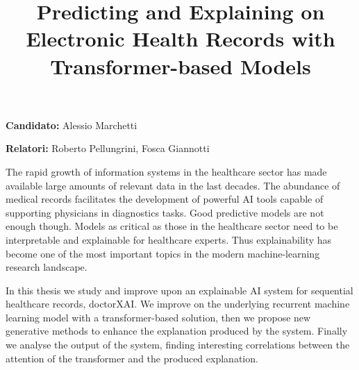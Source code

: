 \documentclass[]{marticle}
\title{\vspace{-2cm}\textbf{\huge Predicting and Explaining on Electronic Health Records with Transformer-based Models}}
\date{}
\author{}
\begin{document}
\maketitle


\textbf{Candidato:} Alessio Marchetti

\textbf{Relatori:} Roberto Pellungrini, Fosca Giannotti
\vspace{0.5cm}

The rapid growth of information systems in the healthcare sector has made available large amounts of
relevant data in the last decades. The abundance of medical records facilitates the development of
powerful AI tools capable of supporting physicians in diagnostics tasks. Good predictive models are
not enough though. Models as critical as those in the healthcare sector need to be interpretable and
explainable for healthcare experts. Thus explainability has become one of the most important topics
in the modern machine-learning research landscape.

In this thesis we study and improve upon an explainable AI system for sequential healthcare records,
doctorXAI. We improve on the underlying recurrent machine learning model with a transformer-based
solution, then we propose new generative methods to enhance the explanation produced by the system.
Finally we analyse the output of the system, finding interesting correlations between the attention
of the transformer and the produced explanation.
\end{document}
